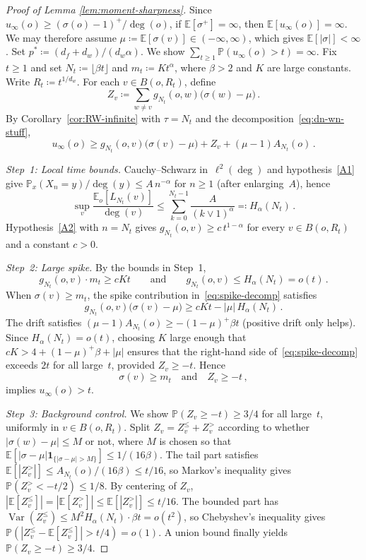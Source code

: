 \documentclass[aop]{imsart}
\theoremstyle{plain}
\theoremstyle{definition}
\newcommand{\E}{\mathbb{E}}
\renewcommand{\P}{\mathbb{P}}
\newcommand{\one}{\mathbf{1}}
\DeclareMathOperator{\var}{Var}
\begin{document}
	\begin{proof}[Proof of Lemma \ref{lem:moment-sharpness}]
		Since $u_\infty(o)\geq(\sigma(o)-1)^+/\deg(o)$, if $\E[\sigma^+]=\infty$, then $\E[u_\infty(o)]=\infty$. We may therefore assume $\mu\coloneqq\E[\sigma(v)] \in (-\infty, \infty)$, which gives $\E[|\sigma|]<\infty$.  Set $p^*\coloneqq(d_f+d_w)/(d_w\alpha)$.  We show $\sum_{t\geq 1}\P(u_\infty(o)>t)=\infty$. Fix $t\geq 1$ and set $N_t\coloneqq \lfloor \beta t\rfloor$ and $m_t\coloneqq K t^{\alpha}$, where $\beta>2$ and $K$ are large constants.  Write $R_t\coloneqq t^{1/d_w}$.  For each $v\in B(o,R_t)$, define
		\[
		Z_v\coloneqq\sum_{w\neq v}g_{N_t}(o,w)\bigl(\sigma(w)-\mu\bigr)\,.
		\]
		By Corollary~\ref{cor:RW-infinite} with $\tau=N_t$ and the decomposition~\eqref{eq:dn-wn-stuff},
		\begin{equation}\label{eq:spike-decomp}
			u_\infty(o)\geq g_{N_t}(o,v)\bigl(\sigma(v)-\mu\bigr)+Z_v+(\mu-1)A_{N_t}(o)\,.
		\end{equation}
		
		\emph{Step~1: Local time bounds.}  Cauchy--Schwarz in~$\ell^2(\deg)$ and hypothesis~\ref{A1} give $\P_x(X_n=y)/\deg(y)\leq A\,n^{-\alpha}$ for $n\geq 1$ (after enlarging~$A$), hence
		\begin{equation}\label{eq:local-time-ub}
			\sup_v\frac{\E_o[L_{N_t}(v)]}{\deg(v)}\leq\sum_{k=0}^{N_t-1}\frac{A}{(k\vee 1)^{\alpha}}\eqqcolon H_\alpha(N_t)\,.
		\end{equation}
		Hypothesis~\ref{A2} with $n=N_t$ gives $g_{N_t}(o,v)\geq c\,t^{1-\alpha}$ for every $v\in B(o,R_t)$ and a constant $c>0$.
		
		\emph{Step~2: Large spike.}  By the bounds in Step~1,
		\[
		g_{N_t}(o,v)\cdot m_t\geq cKt
		\qquad\text{and}\qquad
		g_{N_t}(o,v)\leq H_\alpha(N_t)=o(t)\,.
		\]
		When $\sigma(v)\geq m_t$, the spike contribution in~\eqref{eq:spike-decomp} satisfies
		\[
		g_{N_t}(o,v)\bigl(\sigma(v)-\mu\bigr)\geq cKt-|\mu|\,H_\alpha(N_t)\,.
		\]
		The drift satisfies $(\mu-1)A_{N_t}(o)\geq -(1-\mu)^+\beta t$ (positive drift only helps).  Since $H_\alpha(N_t)=o(t)$, choosing $K$ large enough that $cK>4+(1-\mu)^+\beta+|\mu|$ ensures that the right-hand side of~\eqref{eq:spike-decomp} exceeds $2t$ for all large~$t$, provided $Z_v\geq -t$.  Hence
		\begin{equation}\label{eq:spike-wins}
			\sigma(v)\geq m_t\quad\text{and}\quad Z_v\geq -t\,,
		\end{equation}
		implies $u_\infty(o)>t$.
		
		\emph{Step~3: Background control.}  We show $\P(Z_v\geq -t)\geq 3/4$ for all large~$t$, uniformly in $v\in B(o,R_t)$.  Split $Z_v=Z_v^{\leq}+Z_v^{>}$ according to whether $|\sigma(w)-\mu|\leq M$ or not, where $M$ is chosen so that $\E[|\sigma-\mu|\one_{\{|\sigma-\mu|>M\}}]\leq 1/(16\beta)$.  The tail part satisfies $\E[|Z_v^{>}|]\leq A_{N_t}(o)/(16\beta)\leq t/16$, so Markov's inequality gives $\P(Z_v^{>}<-t/2)\leq 1/8$.  By centering of $Z_v$, $|\E[Z_v^{\leq}]|=|\E[Z_v^{>}]|\leq\E[|Z_v^{>}|]\leq t/16$. The bounded part has $\var(Z_v^{\leq})\leq M^2 H_\alpha(N_t)\cdot\beta t=o(t^2)$, so Chebyshev's inequality gives $\P(|Z_v^{\leq}-\E[Z_v^{\leq}]|>t/4)=o(1)$.  A union bound finally yields $\P(Z_v\geq -t)\geq 3/4$.
		

\end{proof}
\end{document}
